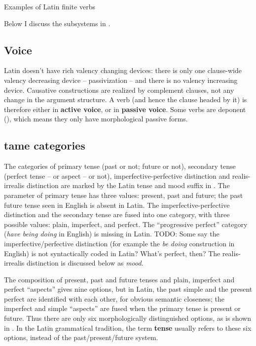 \documentclass[a4paper, oneside, 12pt]{report}
\newcommand*{\concept}[1]{\textbf{#1}}
\newcommand{\form}[1]{\emph{#1}}
\begin{document}
\begin{sidewaystable}
    \centering
    \caption{Examples of Latin finite verbs}
    \label{tbl:latin-finite-verbs}
        
\end{sidewaystable}

Below I discuss the subsystems in .

\subsection{Voice}

Latin doesn't have rich valency changing devices:
there is only one clause-wide valency decreasing device -- passivization -- 
and there is no valency increasing device.
Causative constructions are realized by complement clauses,
not any change in the argument structure.
A verb (and hence the clause headed by it) is therefore either in \concept{active voice},
or in \concept{passive voice}.
Some verbs are deponent (),
which means they only have morphological passive forms.

\subsection{\acs{tame} categories}\label{sec:verb-inflection.finite-template.tame}

The categories of primary tense (past or not; future or not),
secondary tense (perfect tense -- or aspect -- or not),
imperfective-perfective distinction 
and realis-irrealis distinction 
are marked by the Latin tense and mood suffix in .
The parameter of primary tense has three values: 
present, past and future;
the past future tense seen in English 
is absent in Latin.
The imperfective-perfective distinction and the secondary tense 
are fused into one category,
with three possible values: 
plain, imperfect, and perfect. 
The ``progressive perfect'' category (\form{have being doing} in English)
is missing in Latin.
TODO: Some say the imperfective/perfective distinction 
(for example the \form{be doing} construction in English)
is not syntactically coded in Latin?
What's perfect, then?
The realis-irrealis distinction is discussed below as \emph{mood}.

The composition of present, past and future tenses
and plain, imperfect and perfect ``aspects''
gives nine options,
but in Latin, 
the past simple and the present perfect are identified with each other,
for obvious semantic closeness;
the imperfect and simple ``aspects'' are fused 
when the primary tense is present or future.
Thus there are only six morphologically distinguished options,
as is shown in . 
In the Latin grammatical tradition, 
the term \concept{tense} 
usually refers to these six options,
instead of the past/present/future system.
\end{document}

